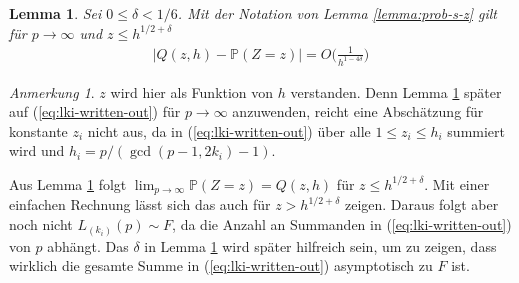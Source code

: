 \documentclass[a4paper, 11pt, ngerman]{article}
\renewcommand{\P}{\mathbb{P}}
\theoremstyle{definition}
\theoremstyle{plain}
\newtheorem{lemma}{Lemma}
\theoremstyle{remark}
\newtheorem*{remark*}{Anmerkung}
\begin{document}
\begin{lemma}
    Sei $0 \le \delta < 1/6$. Mit der Notation von Lemma \ref{lemma:prob-s-z} gilt für $p \to \infty$ und $z \le h^{1/2 + \delta}$
    \begin{align*}
        |Q(z, h) - \P(Z = z)| = O \bigg ( \frac 1 {h^{1 - 4\delta}} \bigg )
    \end{align*}

    \label{lemma:prob-s-z-asmyp}
\end{lemma}

\begin{remark*}
    $z$ wird hier als Funktion von $h$ verstanden. Denn Lemma \ref{lemma:prob-s-z-asmyp} später auf (\ref{eq:lki-written-out}) für $p \to \infty$ anzuwenden, reicht eine Abschätzung für konstante $z_i$ nicht aus, da in (\ref{eq:lki-written-out}) über alle $1 \le z_i \le h_i$ summiert wird und $h_i = p/(\gcd(p - 1, 2k_i) - 1)$.

    Aus Lemma \ref{lemma:prob-s-z-asmyp} folgt $\lim_{p \to \infty} \P(Z = z) = Q(z, h)$ für $z \le h^{1/2 + \delta}$. Mit einer einfachen Rechnung lässt sich das auch für $z > h^{1/2 +\delta}$ zeigen. Daraus folgt aber noch nicht $L_{(k_i)}(p) \sim F$, da die Anzahl an Summanden in (\ref{eq:lki-written-out}) von $p$ abhängt. Das $\delta$ in Lemma \ref{lemma:prob-s-z-asmyp} wird später hilfreich sein, um zu zeigen, dass wirklich die gesamte Summe in (\ref{eq:lki-written-out}) asymptotisch zu $F$ ist.
\end{remark*}
\end{document}
